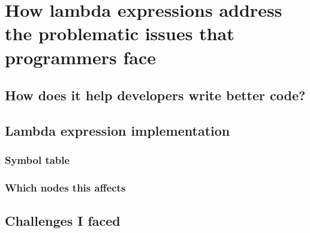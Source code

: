 \documentclass[twocolumn,notitlepage]{report}
\begin{document}
\section*{How lambda expressions address the problematic issues that programmers face}
\subsection*{How does it help developers write better code?}
\subsection*{Lambda expression implementation}
\subsubsection*{Symbol table}
\subsubsection*{Which nodes this affects}
\subsection*{Challenges I faced}




\end{document}
